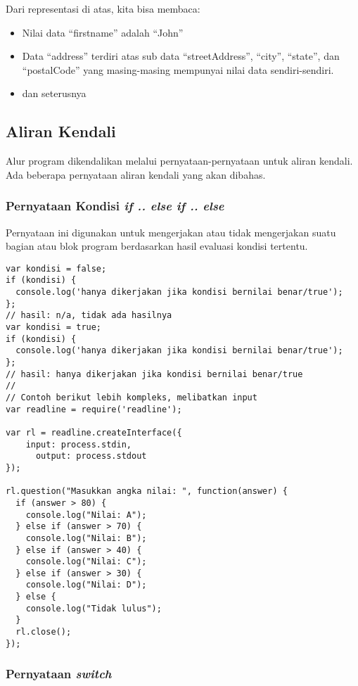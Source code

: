 Dari representasi di atas, kita bisa membaca:
\begin{itemize}
  \item Nilai data ``firstname'' adalah ``John''
  \item Data ``address'' terdiri atas sub data ``streetAddress'', ``city'', ``state'', dan ``postalCode'' yang masing-masing mempunyai nilai data sendiri-sendiri.
  \item dan seterusnya
\end{itemize}

\subsection{Aliran Kendali}

Alur program dikendalikan melalui pernyataan-pernyataan untuk aliran kendali. Ada beberapa pernyataan aliran kendali yang akan dibahas.

\subsubsection{Pernyataan Kondisi \textit{if .. else if .. else}}

Pernyataan ini digunakan untuk mengerjakan atau tidak mengerjakan suatu bagian atau blok program berdasarkan hasil evaluasi kondisi tertentu.

\begin{lstlisting}
var kondisi = false;
if (kondisi) {
  console.log('hanya dikerjakan jika kondisi bernilai benar/true');
};
// hasil: n/a, tidak ada hasilnya
var kondisi = true;
if (kondisi) {
  console.log('hanya dikerjakan jika kondisi bernilai benar/true');
};
// hasil: hanya dikerjakan jika kondisi bernilai benar/true
//
// Contoh berikut lebih kompleks, melibatkan input
var readline = require('readline');

var rl = readline.createInterface({
    input: process.stdin,
      output: process.stdout
});

rl.question("Masukkan angka nilai: ", function(answer) {
  if (answer > 80) {
    console.log("Nilai: A");
  } else if (answer > 70) {
    console.log("Nilai: B");
  } else if (answer > 40) {
    console.log("Nilai: C");
  } else if (answer > 30) {
    console.log("Nilai: D");
  } else {
    console.log("Tidak lulus");
  }
  rl.close();
});
\end{lstlisting}

\subsubsection{Pernyataan \textit{switch}}

